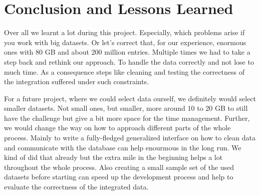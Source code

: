 \section{Conclusion and Lessons Learned}
Over all we learnt a lot during this project. Especially, which problems arise if you work with big datasets. Or let's correct that, for our experience, enormous ones with 80 GB and about 200 million entries.
Multiple times we had to take a step back and rethink our approach. To handle the data correctly and not lose to much time.
As a consequence steps like cleaning and testing the correctness of the integration suffered under such constraints.

For a future project, where we could select data ourself, we definitely would select smaller datasets. Not small ones, but smaller, more around 10 to 20 GB to still have the challenge but give a bit more space for the time management.
Further, we would change the way on how to approach different parts of the whole process.
Mainly to write a fully-fledged generalized interface on how to clean data and communicate with the database can help enourmous in the long run. We kind of did that already but the extra mile in the beginning helps a lot throughout the whole process.
Also creating a small sample set of the used datasets before starting can speed up the development process and help to evaluate the correctness of the integrated data.


